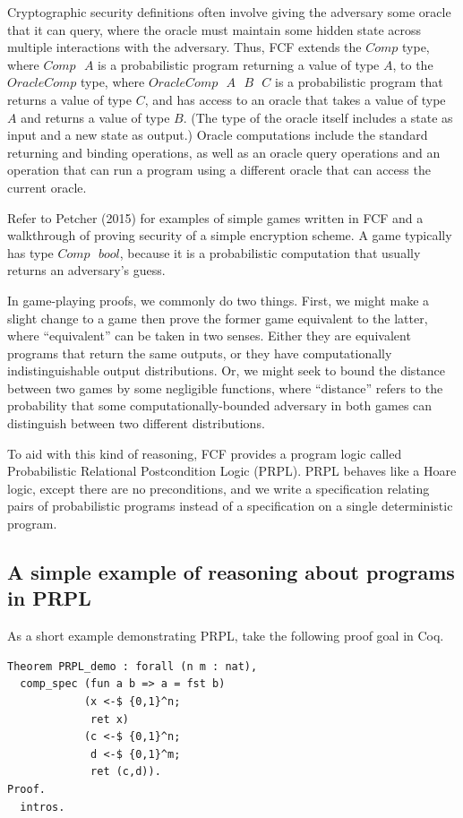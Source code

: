 \documentclass[12pt,lot, lof]{puthesis}
\newcommand{\s} {\textrm{ }}
\begin{document}
Cryptographic security definitions often involve giving the adversary some oracle that it can query, where the oracle must maintain some hidden state across multiple interactions with the adversary. Thus, FCF extends the $Comp$ type, where $Comp \s A$ is a probabilistic program returning a value of type $A$, to the $OracleComp$ type, where $OracleComp \s A \s B \s C$ is a probabilistic program that returns a value of type $C$, and has access to an oracle that takes a value of type $A$ and returns a value of type $B$. (The type of the oracle itself includes a state as input and a new state as output.) Oracle computations include the standard returning and binding operations, as well as an oracle query operations and an operation that can run a program using a different oracle that can access the current oracle.

Refer to Petcher (2015) for examples of simple games written in FCF and a walkthrough of proving security of a simple encryption scheme. A game typically has type $Comp \s bool$, because it is a probabilistic computation that usually returns an adversary's guess.

In game-playing proofs, we commonly do two things. First, we might make a slight change to a game then prove the former game equivalent to the latter, where ``equivalent'' can be taken in two senses. Either they are equivalent programs that return the same outputs, or they have computationally indistinguishable output distributions. Or, we might seek to bound the distance between two games by some negligible functions, where ``distance'' refers to the probability that some computationally-bounded adversary in both games can distinguish between two different distributions.

To aid with this kind of reasoning, FCF provides a program logic called Probabilistic Relational Postcondition Logic (PRPL). PRPL behaves like a Hoare logic, except there are no preconditions, and we write a specification relating pairs of probabilistic programs instead of a specification on a single deterministic program.

\subsection{A simple example of reasoning about programs in PRPL}

As a short example demonstrating PRPL, take the following proof goal in Coq.

\begin{lstlisting}
Theorem PRPL_demo : forall (n m : nat),
  comp_spec (fun a b => a = fst b)
            (x <-$ {0,1}^n;
             ret x)
            (c <-$ {0,1}^n;
             d <-$ {0,1}^m;
             ret (c,d)).
Proof.
  intros.
\end{lstlisting}
\end{document}
